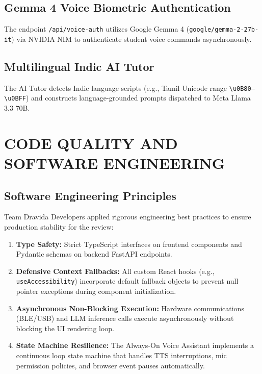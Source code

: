 \documentclass[12pt,a4paper]{report}
\begin{document}
\section{Gemma 4 Voice Biometric Authentication}
The endpoint \texttt{/api/voice-auth} utilizes Google Gemma 4 (\texttt{google/gemma-2-27b-it}) via NVIDIA NIM to authenticate student voice commands asynchronously.

\section{Multilingual Indic AI Tutor}
The AI Tutor detects Indic language scripts (e.g., Tamil Unicode range \texttt{\textbackslash u0B80--\textbackslash u0BFF}) and constructs language-grounded prompts dispatched to Meta Llama 3.3 70B.

\clearpage
\chapter{CODE QUALITY AND SOFTWARE ENGINEERING}

\section{Software Engineering Principles}
Team Dravida Developers applied rigorous engineering best practices to ensure production stability for the review:
\begin{enumerate}
    \item \textbf{Type Safety:} Strict TypeScript interfaces on frontend components and Pydantic schemas on backend FastAPI endpoints.
    \item \textbf{Defensive Context Fallbacks:} All custom React hooks (e.g., \texttt{useAccessibility}) incorporate default fallback objects to prevent null pointer exceptions during component initialization.
    \item \textbf{Asynchronous Non-Blocking Execution:} Hardware communications (BLE/USB) and LLM inference calls execute asynchronously without blocking the UI rendering loop.
    \item \textbf{State Machine Resilience:} The Always-On Voice Assistant implements a continuous loop state machine that handles TTS interruptions, mic permission policies, and browser event pauses automatically.
\end{enumerate}
\end{document}
